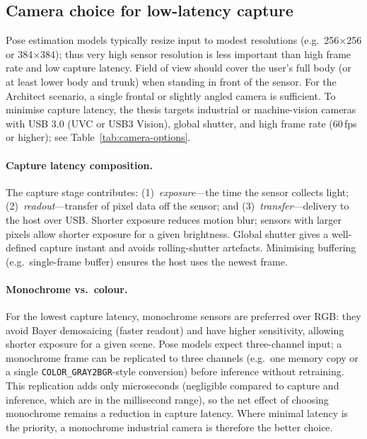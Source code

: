 \subsection{Camera choice for low-latency capture}

Pose estimation models typically resize input to modest resolutions (e.g.\ 256$\times$256 or 384$\times$384); thus very high sensor resolution is less important than high frame rate and low capture latency. Field of view should cover the user's full body (or at least lower body and trunk) when standing in front of the sensor. For the Architect scenario, a single frontal or slightly angled camera is sufficient. To minimise capture latency, the thesis targets industrial or machine-vision cameras with USB 3.0 (UVC or USB3 Vision), global shutter, and high frame rate (60\,fps or higher); see Table~\ref{tab:camera-options}.

\paragraph{Capture latency composition.}
The capture stage contributes: (1)~\emph{exposure}---the time the sensor collects light; (2)~\emph{readout}---transfer of pixel data off the sensor; and (3)~\emph{transfer}---delivery to the host over USB. Shorter exposure reduces motion blur; sensors with larger pixels allow shorter exposure for a given brightness. Global shutter gives a well-defined capture instant and avoids rolling-shutter artefacts. Minimising buffering (e.g.\ single-frame buffer) ensures the host uses the newest frame.

\paragraph{Monochrome vs.\ colour.}
For the lowest capture latency, monochrome sensors are preferred over RGB: they avoid Bayer demosaicing (faster readout) and have higher sensitivity, allowing shorter exposure for a given scene. Pose models expect three-channel input; a monochrome frame can be replicated to three channels (e.g.\ one memory copy or a single \texttt{COLOR\_GRAY2BGR}-style conversion) before inference without retraining. This replication adds only microseconds (negligible compared to capture and inference, which are in the millisecond range), so the net effect of choosing monochrome remains a reduction in capture latency. Where minimal latency is the priority, a monochrome industrial camera is therefore the better choice.

